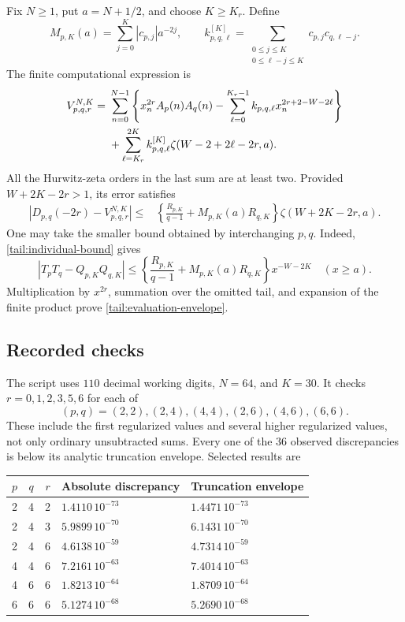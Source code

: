 Fix \(N\ge1\), put \(a=N+1/2\), and choose \(K\ge K_r\).
Define
\[
 M_{p,K}(a)=\sum_{j=0}^{K}|c_{p,j}|a^{-2j},\qquad
 k_{p,q,\ell}^{[K]}
   =\sum_{\substack{0\le j\le K\\0\le\ell-j\le K}}
                         c_{p,j}c_{q,\ell-j}.
\]
The finite computational expression is
\begin{align}\label{tail:finite-evaluation}
 V_{p,q,r}^{N,K}={}&
 \sum_{n=0}^{N-1}\left\{x_n^{2r}A_p(n)A_q(n)
     -\sum_{\ell=0}^{K_r-1}
            k_{p,q,\ell}x_n^{2r+2-W-2\ell}\right\}\notag\\
 &+\sum_{\ell=K_r}^{2K}
       k_{p,q,\ell}^{[K]}\zeta(W-2+2\ell-2r,a).
\end{align}
All the Hurwitz-zeta orders in the last sum are at least two.
Provided \(W+2K-2r>1\), its error satisfies
\begin{align}\label{tail:evaluation-envelope}
 |D_{p,q}(-2r)-V_{p,q,r}^{N,K}|
 \le{}&\left\{\frac{R_{p,K}}{q-1}
                   +M_{p,K}(a)R_{q,K}\right\}
                     \zeta(W+2K-2r,a).
\end{align}
One may take the smaller bound obtained by interchanging \(p,q\).
Indeed, \eqref{tail:individual-bound} gives
\[
 |T_pT_q-Q_{p,K}Q_{q,K}|
 \le\left\{\frac{R_{p,K}}{q-1}
                   +M_{p,K}(a)R_{q,K}\right\}x^{-W-2K}
 \quad(x\ge a).
\]
Multiplication by \(x^{2r}\), summation over the omitted tail,
and expansion of the finite product prove
\eqref{tail:evaluation-envelope}.

\subsection{Recorded checks}

The script uses \(110\) decimal working digits, \(N=64\), and
\(K=30\). It checks \(r=0,1,2,3,5,6\) for each of
\[
 (p,q)=(2,2),(2,4),(4,4),(2,6),(4,6),(6,6).
\]
These include the first regularized values and several higher
regularized values, not only ordinary unsubtracted sums.
Every one of the \(36\) observed discrepancies is below its
analytic truncation envelope. Selected results are
\begin{center}
\begin{tabular}{cccll}
\hline
\(p\)&\(q\)&\(r\)&Absolute discrepancy&Truncation envelope\\
\hline
2&4&2&\(1.4110\,10^{-73}\)&\(1.4471\,10^{-73}\)\\
2&4&3&\(5.9899\,10^{-70}\)&\(6.1431\,10^{-70}\)\\
2&4&6&\(4.6138\,10^{-59}\)&\(4.7314\,10^{-59}\)\\
4&4&6&\(7.2161\,10^{-63}\)&\(7.4014\,10^{-63}\)\\
4&6&6&\(1.8213\,10^{-64}\)&\(1.8709\,10^{-64}\)\\
6&6&6&\(5.1274\,10^{-68}\)&\(5.2690\,10^{-68}\)\\
\hline
\end{tabular}
\end{center}

